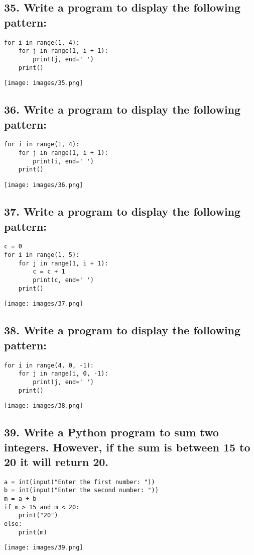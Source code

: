 \documentclass[12pt]{article}
\begin{document}
\subsection*{35. Write a program to display the following pattern:}
\begin{verbatim}
for i in range(1, 4):
    for j in range(1, i + 1):
        print(j, end=' ')
    print()
\end{verbatim}
\texttt{[image: images/35.png]}

\subsection*{36. Write a program to display the following pattern:}
\begin{verbatim}
for i in range(1, 4):
    for j in range(1, i + 1):
        print(i, end=' ')
    print()
\end{verbatim}
\texttt{[image: images/36.png]}

\subsection*{37. Write a program to display the following pattern:}
\begin{verbatim}
c = 0
for i in range(1, 5):
    for j in range(1, i + 1):
        c = c + 1
        print(c, end=' ')
    print()
\end{verbatim}
\texttt{[image: images/37.png]}

\subsection*{38. Write a program to display the following pattern:}
\begin{verbatim}
for i in range(4, 0, -1):
    for j in range(i, 0, -1):
        print(j, end=' ')
    print()
\end{verbatim}
\texttt{[image: images/38.png]}

\subsection*{39. Write a Python program to sum two integers. However, if the sum is between 15 to 20 it will return 20.}
\begin{verbatim}
a = int(input("Enter the first number: "))
b = int(input("Enter the second number: "))
m = a + b
if m > 15 and m < 20:
    print("20")
else:
    print(m)
\end{verbatim}
\texttt{[image: images/39.png]}
\end{document}
